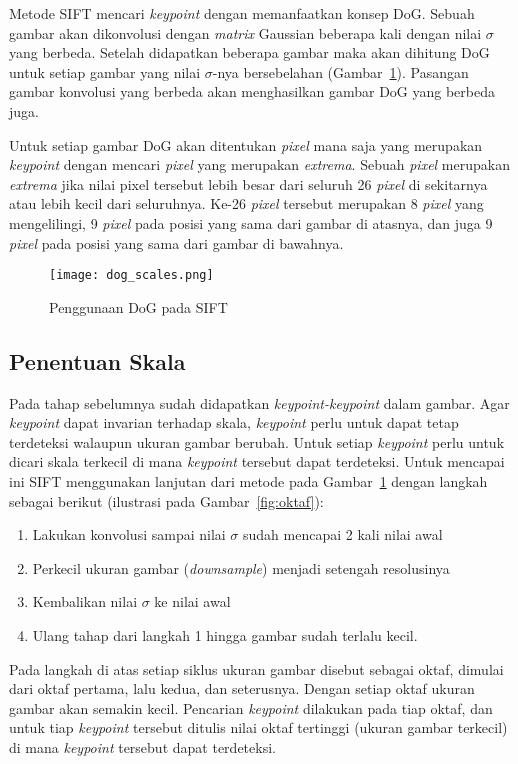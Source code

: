 Metode SIFT mencari \textit{keypoint} dengan memanfaatkan konsep DoG. Sebuah gambar akan dikonvolusi dengan \textit{matrix} Gaussian beberapa kali dengan nilai $\sigma$ yang berbeda. Setelah didapatkan beberapa gambar maka akan dihitung DoG untuk setiap gambar yang nilai $\sigma$-nya bersebelahan (Gambar~\ref{fig:dog_scales}). Pasangan gambar konvolusi yang berbeda akan menghasilkan gambar DoG yang berbeda juga.  

Untuk setiap gambar DoG akan ditentukan \textit{pixel} mana saja yang merupakan \textit{keypoint} dengan mencari \textit{pixel} yang merupakan \textit{extrema}. Sebuah \textit{pixel} merupakan \textit{extrema} jika nilai pixel tersebut lebih besar dari seluruh 26 \textit{pixel} di sekitarnya atau lebih kecil dari seluruhnya. Ke-26 \textit{pixel} tersebut merupakan 8 \textit{pixel} yang mengelilingi, 9 \textit{pixel} pada posisi yang sama dari gambar di atasnya, dan juga 9 \textit{pixel} pada posisi yang sama dari gambar di bawahnya.
\begin{figure}[H]
	\centering
	\texttt{[image: dog\_scales.png]}
	\caption{Penggunaan DoG pada SIFT}
	\label{fig:dog_scales}
\end{figure} 

\newpage
\subsection{Penentuan Skala}
Pada tahap sebelumnya sudah didapatkan \textit{keypoint-keypoint} dalam gambar. Agar \textit{keypoint} dapat invarian terhadap skala, \textit{keypoint} perlu untuk dapat tetap terdeteksi walaupun ukuran gambar berubah. Untuk setiap \textit{keypoint} perlu untuk dicari skala terkecil di mana \textit{keypoint} tersebut dapat terdeteksi. Untuk mencapai ini SIFT menggunakan lanjutan dari metode pada Gambar~\ref{fig:dog_scales} dengan langkah sebagai berikut (ilustrasi pada Gambar~\ref{fig:oktaf}):
\begin{enumerate}
	\item Lakukan konvolusi sampai nilai $\sigma$ sudah mencapai 2 kali nilai awal
	\item Perkecil ukuran gambar (\textit{downsample}) menjadi setengah resolusinya
	\item Kembalikan nilai $\sigma$ ke nilai awal
	\item Ulang tahap dari langkah 1 hingga gambar sudah terlalu kecil.
\end{enumerate}

Pada langkah di atas setiap siklus ukuran gambar disebut sebagai oktaf, dimulai dari oktaf pertama, lalu kedua, dan seterusnya. Dengan setiap oktaf ukuran gambar akan semakin kecil. Pencarian \textit{keypoint} dilakukan pada tiap oktaf, dan untuk tiap \textit{keypoint} tersebut ditulis nilai oktaf tertinggi (ukuran gambar terkecil) di mana \textit{keypoint} tersebut dapat terdeteksi.

